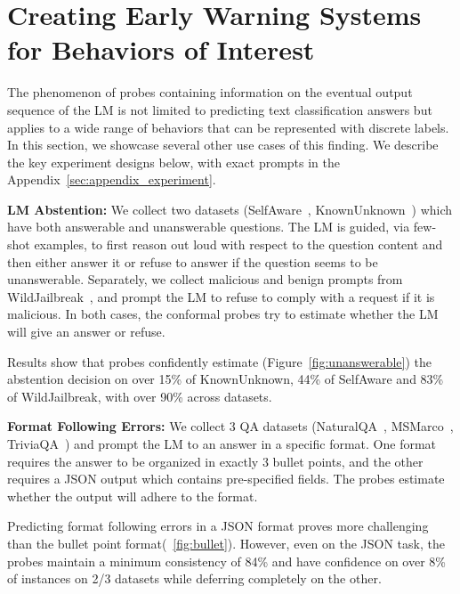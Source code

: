 \section{Creating Early Warning Systems for Behaviors of Interest}
\label{sec:warning}



The phenomenon of probes containing information on the eventual output sequence of the LM is not limited to predicting text classification answers but applies to a wide range of behaviors that can be represented with discrete labels. In this section, we showcase several other use cases of this finding. We describe the key experiment designs below, with exact prompts in the Appendix~\ref{sec:appendix_experiment}.

\noindent\textbf{LM Abstention:} We collect two datasets (SelfAware~\citep{yin-etal-2023-large}, KnownUnknown~\citep{amayuelas2023knowledge}) which have both answerable and unanswerable questions. The LM is guided, via few-shot examples, to first reason out loud with respect to the question content and then either answer it or refuse to answer if the question seems to be unanswerable. Separately, we collect malicious and benign prompts from WildJailbreak~\citep{wildteaming2024}, and prompt the LM to refuse to comply with a request if it is malicious. In both cases, the conformal probes try to estimate whether the LM will give an answer or refuse. 

Results show that probes confidently estimate (Figure~\ref{fig:unanswerable})  the abstention decision on over 15\% of KnownUnknown, 44\% of SelfAware and 83\% of WildJailbreak, with over 90\% across datasets. 

\noindent\textbf{Format Following Errors:} We collect 3 QA datasets (NaturalQA~\citep{kwiatkowski-etal-2019-natural}, MSMarco~\citep{DBLP:journals/corr/NguyenRSGTMD16}, TriviaQA~\citep{joshi-etal-2017-triviaqa}) and prompt the LM to an answer in a specific format. One format requires the answer to be organized in exactly 3 bullet points, and the other requires a JSON output which contains pre-specified fields. The probes estimate whether the output will adhere to the format.

Predicting format following errors in a JSON format proves more challenging than the bullet point format(~\ref{fig:bullet}). However, even on the JSON task, the probes maintain a minimum consistency of 84\% and have confidence on over 8\% of instances on 2/3 datasets while deferring completely on the other. 

